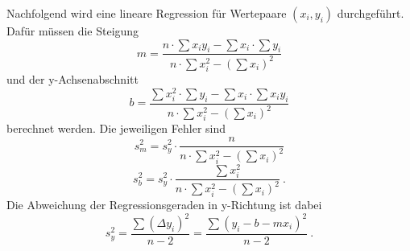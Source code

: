Nachfolgend wird eine lineare Regression für Wertepaare $(x_i,y_i)$ durchgeführt. Dafür müssen die Steigung
\begin{equation}
	m = \dfrac{
		n\cdot\sum x_iy_i-\sum x_i\cdot\sum y_i
		}
		{n\cdot\sum x_i^2-\left(\sum x_i\right)^2
		}
\end{equation}
und der y-Achsenabschnitt
\begin{equation}
	b = \dfrac{
		\sum x_i^2\cdot\sum y_i-\sum x_i\cdot\sum x_iy_i
		}{
		n\cdot\sum x_i^2-\left(\sum x_i\right)^2
		}
\end{equation}
berechnet werden. Die jeweiligen Fehler sind
\begin{equation}
	s_m^2 = s_y^2 \cdot \dfrac{n}{n\cdot\sum x_i^2-\left(\sum x_i\right)^2}
\end{equation}
\begin{equation}
	s_b^2 = s_y^2 \cdot \dfrac{\sum x_i^2}{n\cdot\sum x_i^2-\left(\sum x_i\right)^2}\ .
\end{equation}
Die Abweichung der Regressionsgeraden in y-Richtung ist dabei
\begin{equation}
	s_y^2 = \dfrac{\sum \left(\Delta y_i\right)^2}{n-2} = \dfrac{\sum \left(y_i-b-mx_i\right)^2}{n-2} \ .
\end{equation}